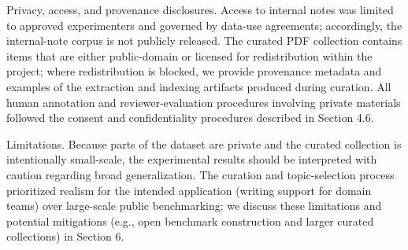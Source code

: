 Privacy, access, and provenance disclosures. Access to internal notes was limited to approved experimenters and governed by data-use agreements; accordingly, the internal-note corpus is not publicly released. The curated PDF collection contains items that are either public-domain or licensed for redistribution within the project; where redistribution is blocked, we provide provenance metadata and examples of the extraction and indexing artifacts produced during curation. All human annotation and reviewer-evaluation procedures involving private materials followed the consent and confidentiality procedures described in Section 4.6.

Limitations. Because parts of the dataset are private and the curated collection is intentionally small-scale, the experimental results should be interpreted with caution regarding broad generalization. The curation and topic-selection process prioritized realism for the intended application (writing support for domain teams) over large-scale public benchmarking; we discuss these limitations and potential mitigations (e.g., open benchmark construction and larger curated collections) in Section 6.